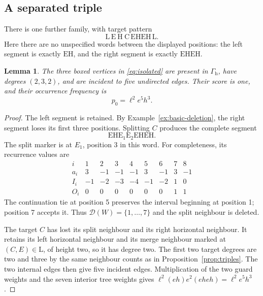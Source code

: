 \documentclass[11pt,a4paper]{article}
\newtheorem{lemma}[theorem]{Lemma}
\theoremstyle{definition}
\theoremstyle{remark}
\newcommand{\E}{\mathrm E}
\newcommand{\HH}{\mathrm H}
\newcommand{\LL}{\mathrm L}
\newcommand{\CC}{\mathrm C}
\newcommand{\Gh}{\Gamma_{\mathrm h}}
\begin{document}
\subsection{A separated triple}\label{sec:separated}
There is one further family, with target pattern
\begin{equation}\label{eq:isolated}
\LL\,\boxed{\E\ \HH\ \CC}\,\E\HH\E\HH\,\LL.
\end{equation}
Here there are no unspecified words between the displayed positions: the left segment is exactly $\E\HH$, and the right segment is exactly $\E\HH\E\HH$.

\begin{lemma}\label{lem:isolated}
The three boxed vertices in \eqref{eq:isolated} are present in $\Gh$, have degrees $(2,3,2)$, and are incident to five undirected edges. Their score is one, and their occurrence frequency is
\begin{equation}\label{eq:p0}
p_0=\ell^2e^5h^3.
\end{equation}
\end{lemma}
\begin{proof}
The left segment is retained. By Example~\ref{ex:basic-deletion}, the right segment loses its first three positions. Splitting $C$ produces the complete segment
\[
\E\HH\E_1\E_2\E\HH\E\HH.
\]
The split marker is at $E_1$, position 3 in this word. For completeness, its recurrence values are
\[
\begin{array}{c|rrrrrrrr}
i&1&2&3&4&5&6&7&8\\\hline
a_i&3&-1&-1&-1&3&-1&3&-1\\
I_i&-1&-2&-3&-4&-1&-2&1&0\\
O_i&0&0&0&0&0&0&1&1
\end{array}
\]
The continuation tie at position 5 preserves the interval beginning at position 1; position 7 accepts it. Thus $\mathcal D(W)=\{1,\ldots,7\}$ and the split neighbour is deleted.

The target $C$ has lost its split neighbour and its right horizontal neighbour. It retains its left horizontal neighbour and its merge neighbour marked at $(C,E)\in\LL$, of height two, so it has degree two. The first two target degrees are two and three by the same neighbour counts as in Proposition~\ref{prop:triples}. The two internal edges then give five incident edges. Multiplication of the two guard weights and the seven interior tree weights gives $\ell^2(eh)e^2(eheh)=\ell^2e^5h^3$.
\end{proof}
\end{document}
